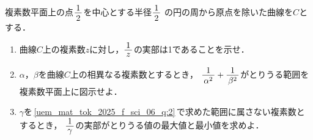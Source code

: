 ﻿\documentclass[../../../uem_mat_tok_q.tex]{subfiles}
\begin{document}
    複素数平面上の点$\myfraca{1}{2}$を中心とする半径$\myfraca{1}{2}$%
    の円の周から原点を除いた曲線を$C$とする．%

    \begin{enumerate}
        \item 曲線$C$上の複素数$z$に対し，$\myfracb{1}{z}$の実部は1であることを示せ．
        \item $\alpha$，$\beta$を曲線$C$上の相異なる複素数とするとき，%
            $\myfraca{1}{\alpha^2}+\myfraca{1}{\beta^2}$がとりうる範囲を複素数平面上に図示せよ．%
            \label{uem_mat_tok_2025_f_sci_06_q:2}
        \item $\gamma$を\,\ref{uem_mat_tok_2025_f_sci_06_q:2}\,で求めた範囲に属さない複素数とするとき，%
            $\myfracb{1}{\gamma}$の実部がとりうる値の最大値と最小値を求めよ．
    \end{enumerate}
\end{document}
